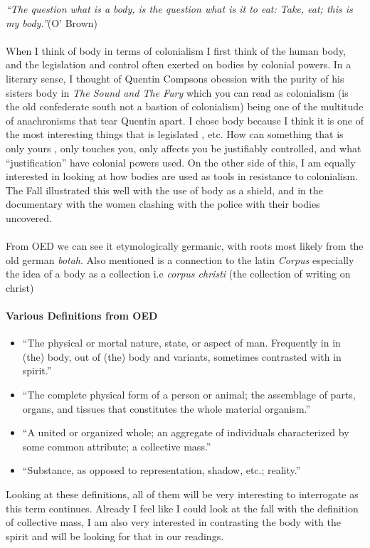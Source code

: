 \textit{``The question what is a body, is the question what is it to eat: Take, eat; this is my body.''}(O' Brown) 
\paragraph{}


When I think of body in terms of colonialism I first think of the human body, and the legislation and control often exerted on bodies by colonial powers. In a literary sense, I thought of Quentin Compsons obession with the purity of his sisters body in \textit{The Sound and The Fury} which you can read as colonialism (is the old confederate south not a bastion of colonialism) being one of the multitude of anachronisms that tear Quentin apart. I chose body because I think it is one of the most interesting things that is legislated , etc. How can something that is only yours , only touches you, only affects you be justifiably controlled, and what ``justification'' have colonial powers used. 
On the other side of this, I am equally interested in looking at how bodies are used as tools in resistance to colonialism. The Fall illustrated this well with the use of body as a shield, and in the documentary with the women clashing with the police with their bodies uncovered.

\paragraph{}
From OED we can see it etymologically germanic, with roots most likely from the old german \textit{botah}. Also mentioned is a connection to the latin \textit{Corpus} especially the idea of a body as a collection i.e \textit{corpus christi} (the collection of writing on christ)
\paragraph{Various Definitions from OED}
\begin{itemize}
\item ``The physical or mortal nature, state, or aspect of man. Frequently in in (the) body, out of (the) body and variants, sometimes contrasted with in spirit.''

\item``The complete physical form of a person or animal; the assemblage of parts, organs, and tissues that constitutes the whole material organism.''

\item``A united or organized whole; an aggregate of individuals characterized by some common attribute; a collective mass.''

\item``Substance, as opposed to representation, shadow, etc.; reality.''

\end{itemize}
Looking at these definitions, all of them will be very interesting to interrogate as this term continues. Already I feel like I could look at the fall with the definition of collective mass, I am also very interested in contrasting the body with the spirit and will be looking for that in our readings.
